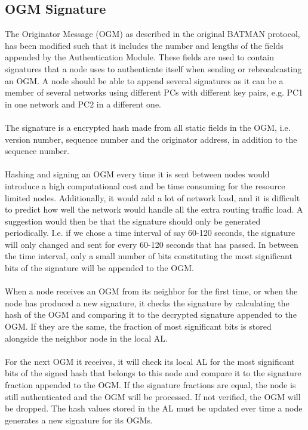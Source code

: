 \subsection{OGM Signature} \label{ogm_signature}
The Originator Message (OGM) as described in the original BATMAN protocol, has been modified such that it includes the number and lengths of the fields appended by the Authentication Module. These fields are used to contain signatures that a node uses to authenticate itself when sending or rebroadcasting an OGM. A node should be able to append several signatures as it can be a member of several networks using different PCs with different key pairs, e.g. PC1 in one network and PC2 in a different one.
\\\\
The signature is a encrypted hash made from all static fields in the OGM, i.e. version number, sequence number and the originator address, in addition to the sequence number.
\\\\
Hashing and signing an OGM every time it is sent between nodes would introduce a high computational cost and be time consuming for the resource limited nodes. Additionally, it would add a lot of network load, and it is difficult to predict how well the network would handle all the extra routing traffic load. A suggestion would then be that the signature should only be generated periodically. I.e. if we chose a time interval of say 60-120 seconds, the signature will only changed and sent for every 60-120 seconds that has passed. In between the time interval, only a small number of bits constituting the most significant bits of the signature will be appended to the OGM.
\\\\
When a node receives an OGM from its neighbor for the first time, or when the node has produced a new signature, it checks the signature by calculating the hash of the OGM and comparing it to the decrypted signature appended to the OGM. If they are the same, the fraction of most significant bits is stored alongside the neighbor node in the local AL.
\\\\
For the next OGM it receives, it will check its local AL for the most significant bits of the signed hash that belongs to this node and compare it to the signature fraction appended to the OGM. If the signature fractions are equal, the node is still authenticated and the OGM will be processed. If not verified, the OGM will be dropped. The hash values stored in the AL must be updated ever time a node generates a new signature for its OGMs.
